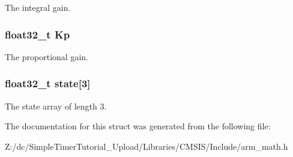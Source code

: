 The integral gain. \hypertarget{structarm__pid__instance__f32_abe23f3e122ef5f55398fcf77c793c425}{
\subsubsection[{Kp}]{\setlength{\rightskip}{0pt plus 5cm}float32\-\_\-t Kp}}\label{structarm__pid__instance__f32_abe23f3e122ef5f55398fcf77c793c425}
The proportional gain. \hypertarget{structarm__pid__instance__f32_a473556ac6100fc188e77930d56f51062}{
\subsubsection[{state}]{\setlength{\rightskip}{0pt plus 5cm}float32\-\_\-t state\mbox{[}3\mbox{]}}}\label{structarm__pid__instance__f32_a473556ac6100fc188e77930d56f51062}
The state array of length 3. 

The documentation for this struct was generated from the following file\-:\begin{DoxyCompactItemize}
\item 
Z\-:/dc/\-Simple\-Timer\-Tutorial\-\_\-\-Upload/\-Libraries/\-C\-M\-S\-I\-S/\-Include/arm\-\_\-math.\-h\end{DoxyCompactItemize}
